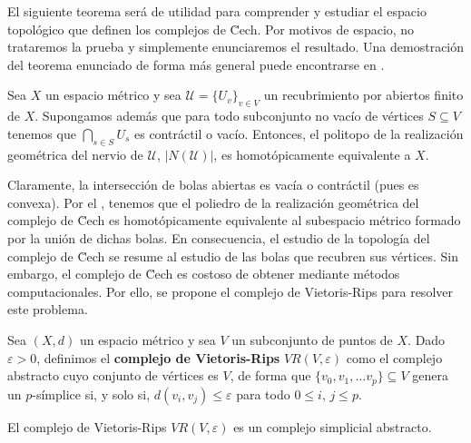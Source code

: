El siguiente teorema será de utilidad para comprender y estudiar el espacio topológico que definen los complejos de \u Cech. Por motivos de espacio, no trataremos la prueba y simplemente enunciaremos el resultado. Una demostración del teorema enunciado de forma más general puede encontrarse en \cite{hatcher2002algebraic}.

\begin{teorema} \label{teo:nerve}
	Sea \(X\) un espacio métrico y sea \(\mathcal{U} = \{U_v\}_{v \in V}\) un recubrimiento por abiertos finito de \(X\). Supongamos además que para todo subconjunto no vacío de vértices \(S \subseteq V\) tenemos que \(\bigcap_{s \in S} U_s\) es contráctil o vacío. Entonces, el politopo de la realización geométrica del nervio de $\mathcal{U}$, \(|N(\mathcal{U})|\), es homotópicamente equivalente a \(X\).
\end{teorema}

Claramente, la intersección de bolas abiertas es vacía o contráctil (pues es convexa). Por el , tenemos que el poliedro de la realización geométrica del complejo de \u Cech es homotópicamente equivalente al subespacio métrico formado por la unión de dichas bolas. En consecuencia, el estudio de la topología del complejo de \u Cech se resume al estudio de las bolas que recubren sus vértices.
Sin embargo, el complejo de \u Cech es costoso de obtener mediante métodos computacionales. Por ello, se propone el complejo de Vietoris-Rips para resolver este problema.

\begin{definicion}
	Sea \((X,d)\) un espacio métrico y sea \(V\) un subconjunto de puntos de \(X\). Dado \(\varepsilon > 0\), definimos el \textbf{complejo de Vietoris-Rips} \(VR(V,\varepsilon)\) como el complejo abstracto cuyo conjunto de vértices es \(V\), de forma que \(\{v_0, v_1, \dots v_p\} \subseteq V\) genera un \(p\)-símplice si, y solo si, \(d(v_i,v_j) \leq \varepsilon\) para todo \(0 \leq i\), \(j \leq p\).
\end{definicion}

\begin{proposicion}
	El complejo de Vietoris-Rips \(VR(V,\varepsilon)\) es un complejo simplicial abstracto.
\end{proposicion}

